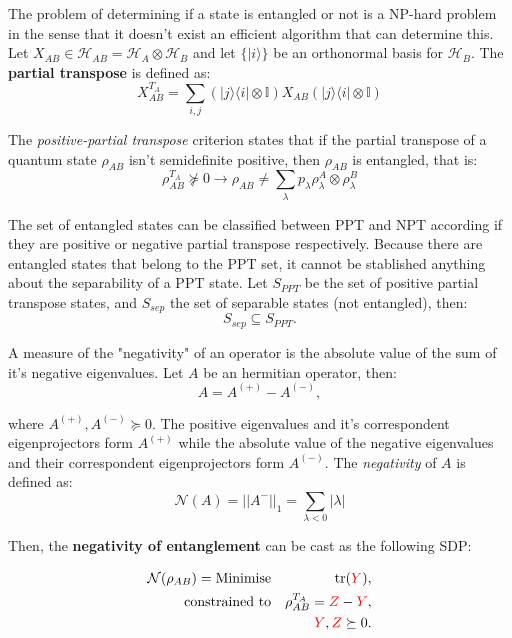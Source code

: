 \documentclass[12pt, letterpaper]{article}
\begin{document}
The problem of determining if a state is entangled or not is a NP-hard problem in the sense that it doesn't exist an efficient algorithm that can determine this.\\

Let $X_{AB} \in \mathcal{H}_{AB} = \mathcal{H}_A \otimes \mathcal{H}_B$ and let $\{ |i\rangle\}$ be an orthonormal basis for $\mathcal{H}_B$. The \textbf{partial transpose} is defined as:
\[
X_{AB}^{T_A} = \sum_{i,j} (|j\rangle \langle i | \otimes \mathbb{I}) X_{AB} (|j\rangle \langle i | \otimes \mathbb{I})
\]

The \textit{positive-partial transpose} criterion states that if the partial transpose of a quantum state $\rho_{AB}$ isn't semidefinite positive, then $\rho_{AB}$ is entangled, that is:
\[
\rho_{AB}^{T_A} \not\succeq 0 \longrightarrow \rho_{AB} \neq \sum_\lambda p_\lambda \rho_\lambda^A \otimes \rho_\lambda^B
\]

The set of entangled states can be classified between PPT and NPT according if they are positive or negative partial transpose respectively. Because there are entangled states that belong to the PPT set, it cannot be stablished anything about the separability of a PPT state. Let $S_{PPT}$ be the set of positive partial transpose states, and $S_{sep}$ the set of separable states (not entangled), then:
\[
S_{sep} \subseteq S_{PPT}.
\]

A measure of the "negativity" of an operator is the absolute value of the sum of it's negative eigenvalues. Let $A$ be an hermitian operator, then:
\[
A = A^{(+)} - A^{(-)},
\]

where $A^{(+)}, A^{(-)} \succeq 0$. The positive eigenvalues and it's correspondent eigenprojectors form $A^{(+)}$ while the absolute value of the negative eigenvalues and their correspondent eigenprojectors form $A^{(-)}$. The \textit{negativity} of $A$ is defined as:
\[
\mathcal{N}(A) = ||A^{-}||_1 = \sum_{\lambda < 0}|\lambda|
\]

Then, the \textbf{negativity of entanglement} can be cast as the following SDP:

\begin{eqnarray*}
    \mathcal{N}(\rho_{AB}) = \text{Minimise} && \operatorname{tr}(\textcolor{red}{Y}), \\
    \text{constrained to} && \rho_{AB}^{T_A} = \textcolor{red}{Z} - \textcolor{red}{Y}, \\
    && \textcolor{red}{Y}, \textcolor{red}{Z} \succeq 0.
\end{eqnarray*}
\end{document}
